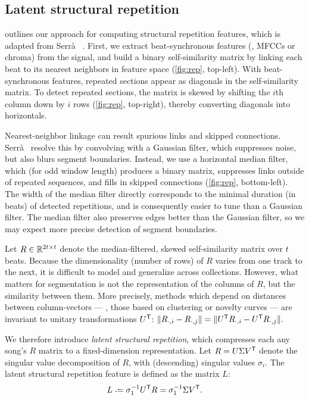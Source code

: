 \documentclass{article}
\begin{document}
\subsection{Latent structural repetition}
 outlines our approach for computing structural repetition features, which is adapted from
Serr\`{a} \etal~\cite{serra2012unsupervised}.  First, we extract beat-synchronous features (\eg, MFCCs or chroma) 
from the signal, and build a binary self-similarity matrix by linking each beat to its nearest neighbors in feature
space (\cref{fig:rep}, top-left). With beat-synchronous features, repeated sections appear as diagonals in the self-similarity
matrix. To detect repeated sections, the matrix is skewed by shifting the $i$th column down by $i$ rows
(\cref{fig:rep}, top-right), thereby converting diagonals into horizontals.

Nearest-neighbor linkage can result spurious links and skipped connections. 
Serr\`{a}~\etal{} resolve this by convolving with a Gaussian filter, which suppresses noise, but also blurs
segment boundaries. Instead, we use a horizontal median filter, which (for odd window length) produces a binary matrix,
suppresses links outside of repeated sequences, and fills in skipped connections (\cref{fig:rep},
bottom-left).  The width of the median filter directly corresponds to the minimal duration (in beats) of detected repetitions,
and is consequently easier to tune than a Gaussian filter.
The median filter also preserves edges better than the Gaussian filter, so we may expect more precise detection of segment boundaries.

Let $R \in \mathbb{R}^{2t \times t}$ denote the median-filtered, skewed self-similarity matrix over $t$ beats.  
Because the dimensionality (number of rows) of $R$ varies from one track to the next,
it is difficult to model and generalize across collections.
However, what matters for segmentation is not the representation of the columns of $R$, but the similarity between them.
More precisely, methods which depend on distances between column-vectors --- \ie, those based on clustering or novelty curves --- 
are invariant to unitary transformations $U^\mathsf{T}$:
$
\|R_{\cdot, i} - R_{\cdot, j}\| = \|U^\mathsf{T} R_{\cdot, i} - U^\mathsf{T} R_{\cdot, j}\|.
$ 

We therefore introduce \emph{latent structural repetition}, which compresses each
any song's $R$ matrix to a fixed-dimension representation.  Let $R = U\Sigma V^\mathsf{T}$ denote the singular value decomposition of $R$,
with (descending) singular values $\sigma_i$. 
The latent structural repetition feature is defined as the matrix $L$:
\begin{equation}
L \defeq \sigma_1^{-1} U\trans R = \sigma_1^{-1} \Sigma V\trans.\label{eq:latent-rep}
\end{equation}
\end{document}

